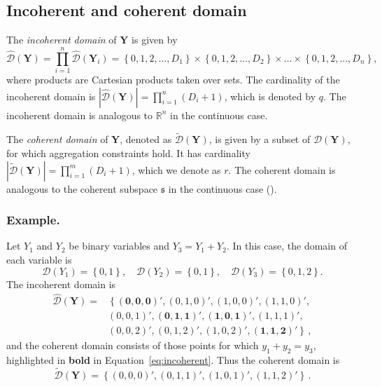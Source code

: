 \documentclass[a4paper,review,12pt,authoryear]{elsarticle}
\newcommand{\bY}{\mathbf{Y}}
\begin{document}
\subsection{Incoherent and coherent domain}\label{sec:domains}
The \textit{incoherent domain} of $\bY$ is given by
\[
\hat{\mathcal D}(\bY)=\prod\limits_{i=1}^n\hat{\mathcal D}(\bY_i)=\left\{0, 1,2,\dots,D_1\right\}\times\left\{0,1,2,\dots,D_2\right\}\times\dots\times\left\{0,1,2,\dots,D_n\right\},
\]
where products are Cartesian products taken over sets.
The cardinality of the incoherent domain is $|\hat{\mathcal D}(\bY)|=\prod\limits_{i=1}^{n} (D_i+1)$, which is denoted by $q$.
The incoherent domain is analogous to $\mathbb{R}^n$ in the continuous case.

The \textit{coherent domain} of $\bY$, denoted as $\tilde{\mathcal D}(\bY)$, is given by a subset of $\hat{\mathcal D}(\bY)$, for which aggregation constraints hold.
It has cardinality $|\tilde{\mathcal D}(\bY)|=\prod\limits_{i=1}^{m} (D_i+1)$, which we denote as $r$.
The coherent domain is analogous to the coherent subspace $\mathfrak{s}$ in the continuous case (\citealp{panagiotelisProbabilisticForecastReconciliation2022}).

  \subsubsection*{\textbf{Example}.}
  \label{sec:example}

  Let $Y_1$ and $Y_2$ be binary variables and $Y_3=Y_1+Y_2$. In this case, the domain of each variable is
  \[
    \mathcal{D}(Y_1)=\left\{0,1\right\},\quad
    \mathcal{D}(Y_2)=\left\{0,1\right\},\quad
    \mathcal{D}(Y_3)=\left\{0,1,2\right\}.
  \]
  The incoherent domain is
  \begin{equation}
  \begin{aligned}
  \hat{\mathcal D}(\bY)=&\left\{\mathbf{(0,0,0)'},(0,1,0)',(1,0,0)',(1,1,0)',\right.\\
  &\left.(0,0,1)',\mathbf{(0,1,1)'},\mathbf{(1,0,1)'},(1,1,1)',\right.\\
  &\left.(0,0,2)',(0,1,2)',(1,0,2)',\mathbf{(1,1,2)'}\right\}\,,
  \end{aligned}
  \label{eq:incoherent}
  \end{equation}
  and the coherent domain consists of those points for which $y_1+y_2=y_3$, highlighted in \textbf{bold} in Equation~\eqref{eq:incoherent}. Thus the coherent domain is
  \[
      \tilde{\mathcal D}(\bY)=\left\{(0,0,0)',(0,1,1)',(1,0,1)',(1,1,2)'\right\}\,.
  \]
\end{document}
